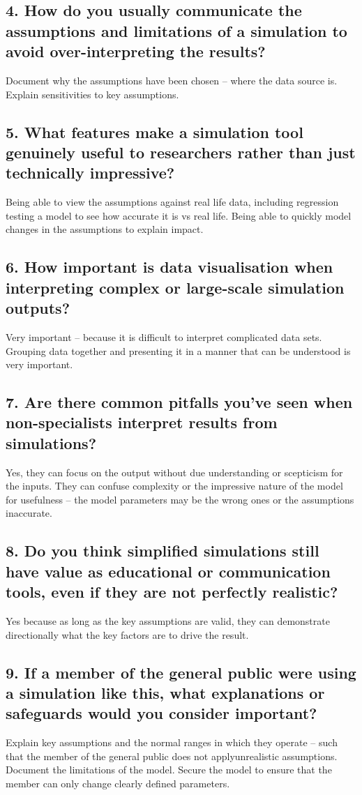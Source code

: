 \subsection*{4. How do you usually communicate the assumptions and limitations of a simulation to avoid over-interpreting the results?}
Document why the assumptions have been chosen – where the data source is.
Explain sensitivities to key assumptions.
\subsection*{5. What features make a simulation tool genuinely useful to researchers rather than just technically impressive?}
Being able to view the assumptions against real life data, including regression testing a model to see how accurate it is vs real life. 
Being able to quickly model changes in the assumptions to explain impact. 

\subsection*{6. How important is data visualisation when interpreting complex or large-scale simulation outputs?}
Very important – because it is difficult to interpret complicated data sets.  Grouping data together and presenting it in a manner that can be understood is very important.
\subsection*{7. Are there common pitfalls you’ve seen when non-specialists interpret results from simulations?}
Yes, they can focus on the output without due understanding or scepticism for the inputs. They can confuse complexity or the impressive nature of the model for usefulness – the model parameters may be the wrong ones or the assumptions inaccurate.

\subsection*{8. Do you think simplified simulations still have value as educational or communication tools, even if they are not perfectly realistic?}
Yes because as long as the key assumptions are valid, they can demonstrate directionally what the key factors are to drive the result. 
\subsection*{9. If a member of the general public were using a simulation like this, what explanations or safeguards would you consider important?}
Explain key assumptions and the normal ranges in which they operate – such that the member of the general public does not applyunrealistic assumptions. 
Document the limitations of the model.
Secure the model to ensure that the member can only change clearly defined parameters. 

